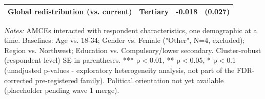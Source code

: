 \begin{table}[H]
\begin{tabular}{ l c c c }
\hspace{0.05cm} Global redistribution (vs. current) & Tertiary & -0.018 & (0.027) \\
\hline \hline
\end{tabular}
\begin{tablenotes}
\small
\item \textit{Notes:} AMCEs interacted with respondent characteristics, one demographic at a time. Baselines: Age vs. 18-34; Gender vs. Female ("Other", N=4, excluded); Region vs. Northwest; Education vs. Compulsory/lower secondary. Cluster-robust (respondent-level) SE in parentheses. *** p$<$0.01, ** p$<$0.05, * p$<$0.1 (unadjusted p-values - exploratory heterogeneity analysis, not part of the FDR-corrected pre-registered family). Political orientation not yet available (placeholder pending wave 1 merge).
\end{tablenotes}
    \label{tab:table9}
\end{table}

